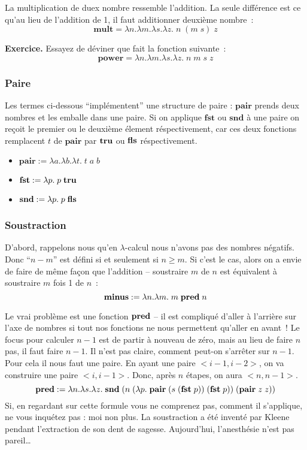 La multiplication de duex nombre ressemble l'addition.
La seule différence est ce qu'au lieu de l'addition de 1, il faut additionner deuxième nombre~:
$$\mathbf{mult} = \lambda n. \lambda m. \lambda s. \lambda z. \; n \; (m \; s) \; z$$

\textbf{Exercice.} Essayez de déviner que fait la fonction suivante~:
$$\mathbf{power} = \lambda n. \lambda m. \lambda s. \lambda z. \; n \; m \; s \; z$$

\subsubsection*{Paire}
Les termes ci-dessous ``implémentent'' une structure de paire : $\mathbf{pair}$ prends deux nombres et les emballe dans une paire. Si on applique $\mathbf{fst}$ ou $\mathbf{snd}$ à une paire on reçoit le premier ou le deuxième élement réspectivement, car ces deux fonctions remplacent $t$ de $\mathbf{pair}$ par $\mathbf{tru}$ ou $\mathbf{fls}$ réspectivement.
\begin{itemize}
	\item $\mathbf{pair} := \lambda a. \lambda b. \lambda t. \; t \; a \; b$
	\item $\mathbf{fst} := \lambda p. \; p \; \mathbf{tru}$
	\item $\mathbf{snd} := \lambda p. \; p \; \mathbf{fls}$
\end{itemize}

\subsubsection*{Soustraction}

D'abord, rappelons nous qu'en $\lambda$-calcul nous n'avons pas des nombres négatifs.
Donc ``$n - m$'' est défini si et seulement si $n \ge m$.
Si c'est le cas, alors on a envie de faire de même façon que l'addition -- soustraire $m$ de $n$ est équivalent à soustraire $m$ fois 1 de $n$~:
$$\textbf{minus} := \lambda n. \lambda m. \; m \; \mathbf{pred} \; n$$

Le vrai problème est une fonction $\mathbf{pred}$ -- il est compliqué d'aller à l'arrière sur l'axe de nombres si tout nos fonctions ne nous permettent qu'aller en avant~!
Le focus pour calculer $n-1$ est de partir à nouveau de zéro, mais au lieu de faire $n$ pas, il faut faire $n-1$.
Il n'est pas claire, comment peut-on s'arrêter sur $n-1$.
Pour cela il nous faut une paire.
En ayant une paire $<i - 1, i - 2>$, on va construire une paire $<i, i-1>$.
Donc, après $n$ étapes, on aura $<n, n-1>$.
\[
	\mathbf{pred} := \lambda n. \lambda s. \lambda z. \;
		\mathbf{snd} \; (n \; (\lambda p. \; \mathbf{pair} \;
			(s \; (\mathbf{fst} \; p)) \;
			(\mathbf{fst} \; p)) \;
		(\mathbf{pair} \; z \; z))
\]
Si, en regardant sur cette formule vous ne comprenez pas, comment il s'applique, ne vous inquétez pas : moi non plus.
La soustraction a été inventé par Kleene pendant l'extraction de son dent de sagesse. Aujourd'hui, l'anesthésie n'est pas pareil\ldots

